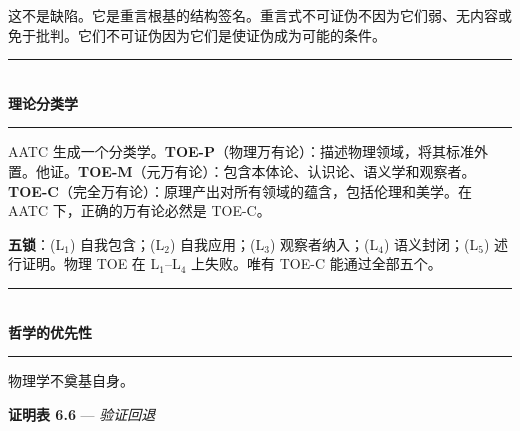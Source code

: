 \documentclass[10pt, openany, oneside]{book}
\renewcommand{\normalsize}{\fontsize{10}{13}\selectfont}
\begin{document}
\noindent 这不是缺陷。它是重言根基的结构签名。重言式不可证伪不因为它们弱、无内容或免于批判。它们不可证伪因为它们是使证伪成为可能的条件。

\vspace{1.5em}


\begin{center}
    \rule{0.3\textwidth}{0.4pt}\\[0.5em]
    {\normalsize\bfseries\scshape 理论分类学}\\[0.3em]
    \rule{0.3\textwidth}{0.4pt}
\end{center}

\vspace{1em}

\noindent AATC 生成一个分类学。\textbf{TOE-P}（物理万有论）：描述物理领域，将其标准外置。他证。\textbf{TOE-M}（元万有论）：包含本体论、认识论、语义学和观察者。\textbf{TOE-C}（完全万有论）：原理产出对所有领域的蕴含，包括伦理和美学。在 AATC 下，正确的万有论必然是 TOE-C。

\textbf{五锁}：(L$_1$) 自我包含；(L$_2$) 自我应用；(L$_3$) 观察者纳入；(L$_4$) 语义封闭；(L$_5$) 述行证明。物理 TOE 在 L$_1$--L$_4$ 上失败。唯有 TOE-C 能通过全部五个。

\vspace{1.5em}


\begin{center}
    \rule{0.3\textwidth}{0.4pt}\\[0.5em]
    {\normalsize\bfseries\scshape 哲学的优先性}\\[0.3em]
    \rule{0.3\textwidth}{0.4pt}
\end{center}

\vspace{1em}

\noindent 物理学不奠基自身。

\vspace{0.5em}

\textbf{证明表 6.6} --- \textit{验证回退}

\vspace{0.5em}
\end{document}
